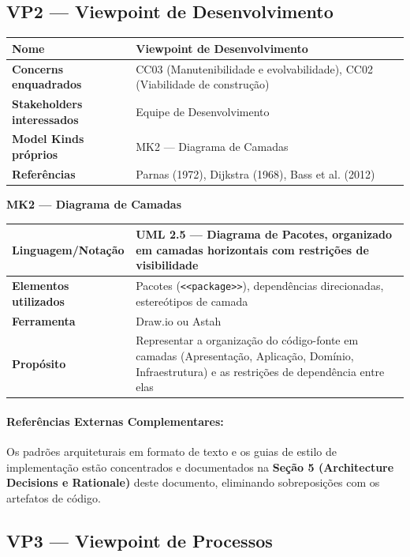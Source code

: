 ﻿\documentclass[12pt,a4paper]{article}
\begin{document}
\subsection{VP2 --- Viewpoint de Desenvolvimento}

\begin{longtable}{|p{4.5cm}|p{10cm}|}
\hline
\textbf{Nome} & Viewpoint de Desenvolvimento \\
\hline
\textbf{Concerns enquadrados} & CC03 (Manutenibilidade e evolvabilidade), CC02 (Viabilidade de construção) \\
\hline
\textbf{Stakeholders interessados} & Equipe de Desenvolvimento \\
\hline
\textbf{Model Kinds próprios} & MK2 --- Diagrama de Camadas \\
\hline
\textbf{Referências} & Parnas (1972), Dijkstra (1968), Bass et al. (2012) \\
\hline
\end{longtable}

\noindent\textbf{MK2 --- Diagrama de Camadas}
\begin{longtable}{|p{4.5cm}|p{10cm}|}
\hline
\textbf{Linguagem/Notação} & UML 2.5 --- Diagrama de Pacotes, organizado em camadas horizontais com restrições de visibilidade \\
\hline
\textbf{Elementos utilizados} & Pacotes (\texttt{<<package>>}), dependências direcionadas, estereótipos de camada \\
\hline
\textbf{Ferramenta} & Draw.io ou Astah \\
\hline
\textbf{Propósito} & Representar a organização do código-fonte em camadas (Apresentação, Aplicação, Domínio, Infraestrutura) e as restrições de dependência entre elas \\
\hline
\end{longtable}

\paragraph{Referências Externas Complementares:} Os padrões arquiteturais em formato de texto e os guias de estilo de implementação estão concentrados e documentados na \textbf{Seção 5 (Architecture Decisions e Rationale)} deste documento, eliminando sobreposições com os artefatos de código.

\subsection{VP3 --- Viewpoint de Processos}
\end{document}
